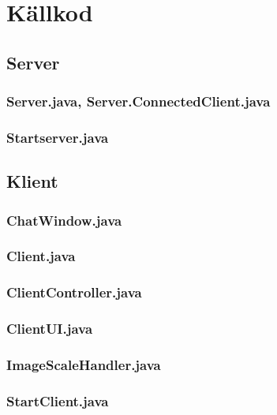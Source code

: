 \documentclass[a4paper,11pt]{article}
\begin{document}
\section{Källkod}

	\subsection{Server}
		\subsubsection{Server.java, Server.ConnectedClient.java}
		
		\subsubsection{Startserver.java}
		
		
	\subsection{Klient}
		\subsubsection{ChatWindow.java}
		
		\subsubsection{Client.java}
		
		\subsubsection{ClientController.java}
		
		\subsubsection{ClientUI.java}
		
		\subsubsection{ImageScaleHandler.java}
		
		\subsubsection{StartClient.java}
		
\end{document}
